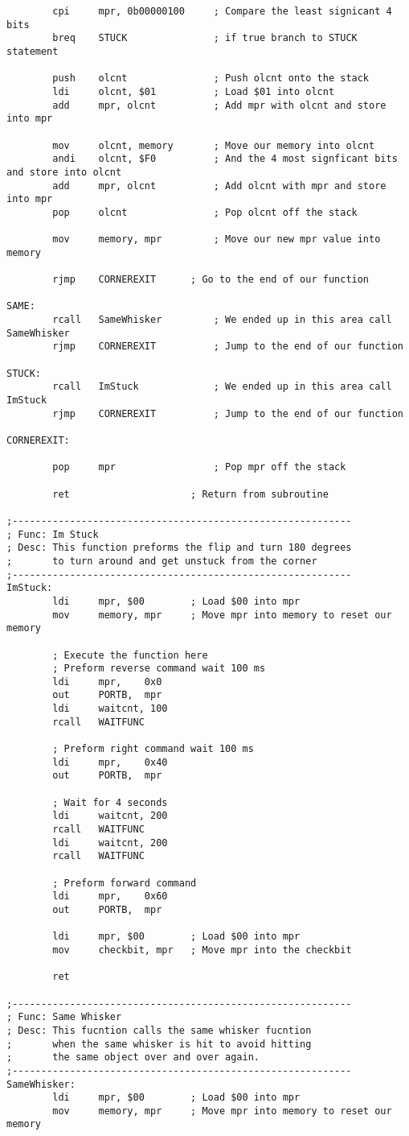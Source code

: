 \documentclass[12pt, letterpaper]{article}
\begin{document}
\begin{verbatim}
		cpi		mpr, 0b00000100		; Compare the least signicant 4 bits
		breq	STUCK				; if true branch to STUCK statement

		push	olcnt				; Push olcnt onto the stack
		ldi		olcnt, $01			; Load $01 into olcnt
		add		mpr, olcnt			; Add mpr with olcnt and store into mpr
		
		mov		olcnt, memory		; Move our memory into olcnt
		andi	olcnt, $F0			; And the 4 most signficant bits and store into olcnt
		add		mpr, olcnt			; Add olcnt with mpr and store into mpr
		pop		olcnt 				; Pop olcnt off the stack

		mov		memory, mpr			; Move our new mpr value into memory

		rjmp	CORNEREXIT		; Go to the end of our function

SAME:
		rcall	SameWhisker			; We ended up in this area call SameWhisker
		rjmp	CORNEREXIT			; Jump to the end of our function

STUCK:
		rcall	ImStuck				; We ended up in this area call ImStuck
		rjmp	CORNEREXIT			; Jump to the end of our function

CORNEREXIT:
		
		pop		mpr					; Pop mpr off the stack

		ret						; Return from subroutine

;-----------------------------------------------------------
; Func: Im Stuck
; Desc: This function preforms the flip and turn 180 degrees
;		to turn around and get unstuck from the corner
;-----------------------------------------------------------
ImStuck:
		ldi		mpr, $00		; Load $00 into mpr
		mov		memory, mpr		; Move mpr into memory to reset our memory

		; Execute the function here
		; Preform reverse command wait 100 ms
		ldi		mpr,	0x0
		out		PORTB,	mpr
		ldi		waitcnt, 100
		rcall	WAITFUNC

		; Preform right command wait 100 ms
		ldi		mpr,	0x40
		out		PORTB,	mpr

		; Wait for 4 seconds
		ldi		waitcnt, 200
		rcall	WAITFUNC
		ldi		waitcnt, 200
		rcall	WAITFUNC

		; Preform forward command
		ldi		mpr,	0x60
		out		PORTB,	mpr

		ldi		mpr, $00		; Load $00 into mpr
		mov		checkbit, mpr	; Move mpr into the checkbit

		ret

;-----------------------------------------------------------
; Func: Same Whisker
; Desc: This fucntion calls the same whisker fucntion
;		when the same whisker is hit to avoid hitting
;		the same object over and over again.
;-----------------------------------------------------------
SameWhisker:
		ldi		mpr, $00		; Load $00 into mpr
		mov		memory, mpr		; Move mpr into memory to reset our memory


\end{verbatim}
\end{document}
